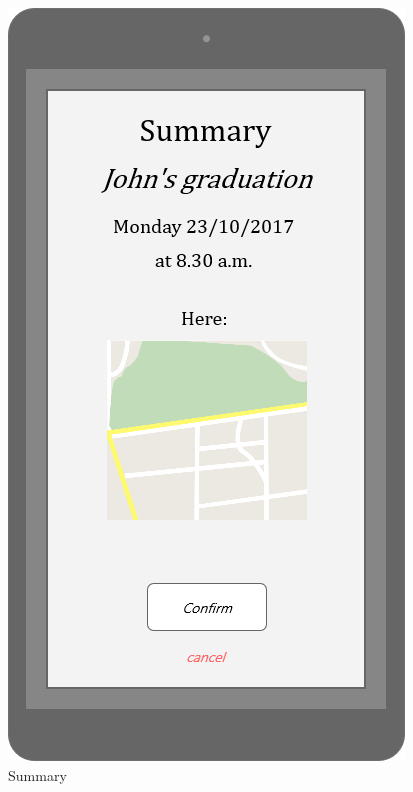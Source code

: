 \documentclass{article}
\begin{document}
\begin{figure}[H]
  \includegraphics[width=\linewidth]{03-Summary.png}
  \caption{Summary}\label{fig:MU6}
\endminipage
\end{figure}
\end{document}
